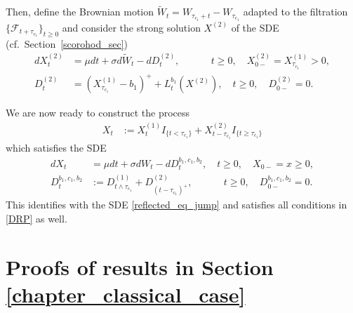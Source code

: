 \documentclass[11pt]{article} %
\numberwithin{komcounter}{section}
\numberwithin{equation}{section}
\numberwithin{theorem}{section}
\begin{document}
Then, define the Brownian motion $\widetilde W_t=W_{\tau_{c_1}+t}-W_{\tau_{c_1}}$ adapted to the filtration $\{\mathcal{F}_{t+\tau_{c_1}}\}_{t\geq 0}$ and consider the strong solution $X^{(2)}$ of the SDE (cf.~Section~\ref{scorohod_sec})
\begin{align*}
dX_t^{(2)} 
&= \mu dt + \sigma d\widetilde{W}_t -dD^{(2)}_t, \qquad \quad\, t\geq 0, \quad X_{0-}^{(2)} = X^{(1)}_{\tau_{c_1}} > 0, \\
D^{(2)}_t 
&= (X^{(1)}_{\tau_{c_1}} - b_1)^+ + L^{b_1}_t(X^{(2)}), \quad t\geq 0, \quad D^{(2)}_{0-}= 0.
\end{align*}

We are now ready to construct the process 
\begin{align*}
X_t &:= X^{(1)}_t I_{\{t<\tau_{c_1}\}} + X^{(2)}_{t-\tau_{c_1}} I_{\{t\geq\tau_{c_1}\}} 
\end{align*}
which satisfies the SDE 
\begin{align*} 
dX_t &= \mu dt + \sigma dW_t - dD^{b_1,c_1,b_2}_t, \quad t\geq 0, \quad X_{0-} = x \geq 0, \\
D^{b_1,c_1,b_2}_t 
&:= D^{(1)}_{t \wedge \tau_{c_1}} + D^{(2)}_{(t-\tau_{c_1})^+}, \qquad \quad\, t\geq 0, \quad D^{b_1,c_1,b_2}_{0-} = 0.
\end{align*}
This identifies with the SDE \eqref{reflected_eq_jump} and satisfies all conditions in \eqref{DRP} as well. 

\section{Proofs of results in Section \ref{chapter_classical_case}}
\label{App_classical}
\end{document}
